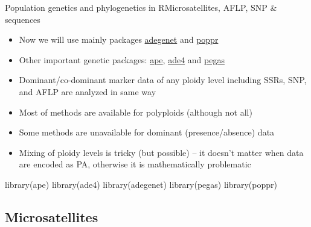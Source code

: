 \documentclass[compress, ucs, xelatex, 11pt, xcolor=svgnames,
  hyperref={
    bookmarks=true,
    unicode=true,
    colorlinks=true,
    pdftitle={Molecular data in R},
    plainpages=false,
    pdfauthor={Vojtech Zeisek},
    pdfsubject={Course about phylogeny and evolution in R},
    pdfcreator={XeLaTeX},
    pdfkeywords={R, evolution, phylogeny, molecular data},
    linkcolor=Tomato,
    anchorcolor=SaddleBrown,
    citecolor=Goldenrod,
    filecolor=DarkMagenta,
    menucolor=Sienna,
    urlcolor=DarkTurquoise,
    pdftex},
  url={hyphens, lowtilde} %
  ]{beamer}
\begin{document}
\begin{frame}[fragile]{Population genetics and phylogenetics in R}{Microsatellites, AFLP, SNP \& sequences}
\begin{multicols}{2}
  \begin{itemize}
    \item Now we will use mainly packages \href{http://adegenet.r-forge.r-project.org/}{adegenet} and \href{http://grunwaldlab.cgrb.oregonstate.edu/poppr-r-package-population-genetics}{poppr}
    \item Other important genetic packages: \href{http://ape-package.ird.fr/}{ape}, \href{http://pbil.univ-lyon1.fr/ADE-4/}{ade4} and \href{http://ape-package.ird.fr/pegas.html}{pegas}
    \item Dominant/co-dominant marker data of any ploidy level including SSRs, SNP, and AFLP are analyzed in same way
    \item Most of methods are available for polyploids (although not all)
    \item Some methods are unavailable for dominant (presence/absence) data
    \item Mixing of ploidy levels is tricky (but possible) -- it doesn't matter when data are encoded as PA, otherwise it is mathematically problematic
  \end{itemize}
  \begin{spluscode}
    library(ape)
    library(ade4)
    library(adegenet)
    library(pegas)
    library(poppr)
  \end{spluscode}
\end{multicols}
\end{frame}

\subsection{Microsatellites}
\end{document}
